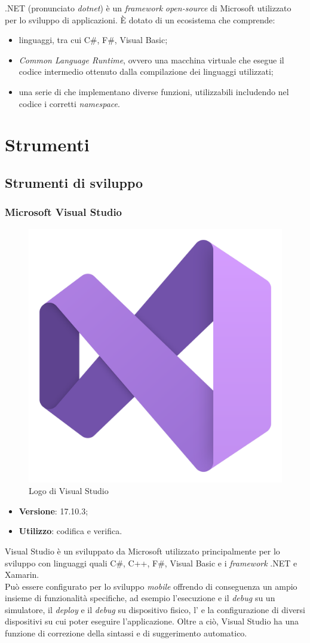 \noindent .NET (pronunciato \textit{dotnet}) è un \textit{framework} \textit{open-source} di Microsoft utilizzato per lo sviluppo di applicazioni. È dotato di un ecosistema che comprende:
\begin{itemize}
    \item linguaggi, tra cui C\#, F\#, Visual Basic;
    \item \textit{Common Language Runtime}, ovvero una macchina virtuale che esegue il codice intermedio ottenuto dalla compilazione dei linguaggi utilizzati;
    \item una serie di  che implementano diverse funzioni, utilizzabili includendo nel codice i corretti \textit{namespace}.
\end{itemize}

\section{Strumenti}

\subsection{Strumenti di sviluppo}

\subsubsection{Microsoft Visual Studio}

\begin{figure}[H]
    \centering 
    \includegraphics[width=0.2\columnwidth]{images/loghi/Visual_Studio.png} 
    \caption{Logo di Visual Studio}
\end{figure}

\begin{itemize}
    \item \textbf{Versione}: 17.10.3;
    \item \textbf{Utilizzo}: codifica e verifica.
\end{itemize}

\noindent Visual Studio è un  sviluppato da Microsoft utilizzato principalmente per lo sviluppo con linguaggi quali C\#, C++, F\#, Visual Basic e i \textit{framework} .NET e Xamarin.\\
Può essere configurato per lo sviluppo \textit{mobile} offrendo di conseguenza un ampio insieme di funzionalità specifiche, ad esempio l'esecuzione e il \textit{debug} su un simulatore, il \textit{deploy} e il \textit{debug} su dispositivo fisico, l'\textit{} e la configurazione di diversi dispositivi su cui poter eseguire l'applicazione. Oltre a ciò, Visual Studio ha una funzione di correzione della sintassi e di suggerimento automatico.

